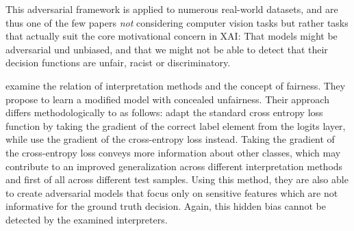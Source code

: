 This adversarial framework is applied to numerous real-world datasets, and are thus one of the few papers \textit{not} considering computer vision tasks but rather tasks that actually suit the core motivational concern in XAI: That models might be adversarial und unbiased, and that we might not be able to detect that their decision functions are unfair, racist or discriminatory. 



\cite{dimanov2020you} examine the relation of interpretation methods and the concept of fairness. They propose to learn a modified model with concealed unfairness. Their approach differs methodologically to \cite{fooling_nn_interpreters} as follows: 
\cite{fooling_nn_interpreters} adapt the standard cross entropy loss function by taking the gradient of the correct label element from the logits layer, while \cite{dimanov2020you} use the gradient of the cross-entropy loss instead. 
Taking the gradient of the cross-entropy loss conveys more information about other classes, which may contribute to an improved generalization across different interpretation methods and first of all across different test samples. 
Using this method, they are also able to create adversarial models that focus only on sensitive features which are not informative for the ground truth decision. Again, this hidden bias cannot be detected by the examined interpreters. 
